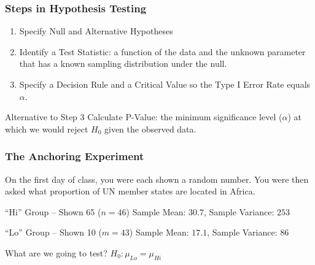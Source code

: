\documentclass[handout]{beamer}
\date{Lecture 22}
\begin{document}
 





\begin{frame}[plain]
	\titlepage 
	

\end{frame} 

\begin{frame}
\frametitle{Steps in Hypothesis Testing}

\begin{enumerate}
\item Specify Null and Alternative Hypotheses
\item Identify a Test Statistic: a function of the data and the unknown parameter that has a known sampling distribution under the null.
\item Specify a Decision Rule and a Critical Value so the Type I Error Rate equals $\alpha$.
\end{enumerate}

\begin{alertblock}{Alternative to Step 3}
	Calculate P-Value: the minimum significance level  ($\alpha$) at which we would reject $H_0$ given the observed data.
\end{alertblock}

\end{frame}



\begin{frame}
\frametitle{The Anchoring Experiment}
On the first day of class, you were each shown a random number. You were then asked what proportion of UN member states are located in Africa. 

	\begin{block}{``Hi'' Group -- Shown 65 ($n=46$)}
		Sample Mean: $30.7$, Sample Variance: $253$
\end{block}


	\begin{block}{``Lo'' Group -- Shown 10 ($m=43$)}
	Sample Mean: $17.1$, Sample Variance: $86$
\end{block}

\begin{alertblock}{What are we going to test?}
	$H_0\colon \mu_{Lo} = \mu_{Hi}$
\end{alertblock}
\end{frame}
\end{document}
